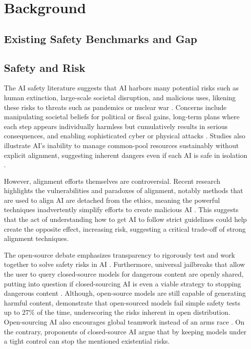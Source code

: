 \section{Background}

\subsection{Existing Safety Benchmarks and Gap}


\subsection{Safety and Risk}

The AI safety literature suggests that AI harbors many potential risks such as human extinction, large-scale societal disruption, and malicious uses, likening these risks to threats such as pandemics or nuclear war \citep{center_for_ai_safety_statement_2025, turchin_classification_2020}. Concerns include manipulating societal beliefs for political or fiscal gains, long-term plans where each step appears individually harmless but cumulatively results in serious consequences, and enabling sophisticated cyber or physical attacks \citep{shevlane_model_2023, ferrara_genai_2024}. Studies also illustrate AI's inability to manage common-pool resources sustainably without explicit alignment, suggesting inherent dangers even if each AI is safe in isolation \citep{perolat_multi_agent_2017, phelps_machine_2024}.

However, alignment efforts themselves are controversial. Recent research highlights the vulnerabilities and paradoxes of alignment, notably methods that are used to align AI are detached from the ethics, meaning the powerful techniques inadvertently simplify efforts to create malicious AI \citep{zhou_emulated_2024, west_ai_2024}. This suggests that the act of understanding how to get AI to follow strict guidelines could help create the opposite effect, increasing risk, suggesting a critical trade-off of strong alignment techniques.

The open-source debate emphasizes transparency to rigorously test and work together to solve safety risks in AI \citep{horowitz_ai_2021}. Furthermore, universal jailbreaks that allow the user to query closed-source models for dangerous content are openly shared, putting into question if closed-sourcing AI is even a viable strategy to stopping dangerous content \citep{elderplinius2025l1b3rt4s, zou_universal_2023}. Although, open-source models are still capable of generating harmful content, \cite{vidgen_simplesafetytests_2024} demonstrate that open-sourced models fail simple safety tests up to 27\% of the time, underscoring the risks inherent in open distribution. Open-sourcing AI also encourages global teamwork instead of an arms race \citep{horowitz_ai_2021}. On the contrary, proponents of closed-source AI argue that by keeping models under a tight control can stop the mentioned existential risks.


